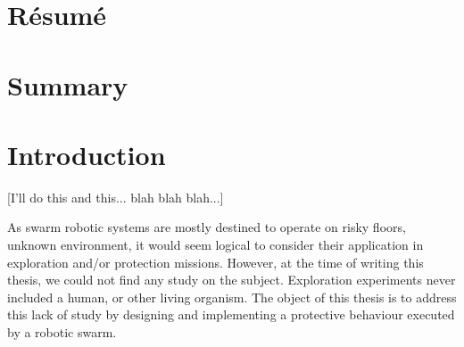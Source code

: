 \documentclass[oneside, a4paper, 12pt]{memoir}
\begin{document}
\chapter{Résumé}
\chapter{Summary}
\tableofcontents
\listoffigures
\listoftables

\listoftodos

\mainmatter
\chapter{Introduction}

[I'll do this and this... blah blah blah...]

As swarm robotic systems are mostly destined to operate on risky floors, unknown environment, it would seem logical to consider their application in exploration and/or protection missions. However, at the time of writing this thesis, we could not find any study on the subject. Exploration experiments never included a human, or other living organism. The object of this thesis is to address this lack of study by designing and implementing a protective behaviour executed by a robotic swarm.
	
\end{document}
